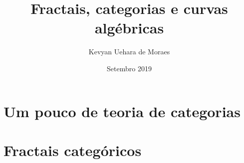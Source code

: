 \documentclass[12pt]{report}
\title{Fractais, categorias e curvas algébricas}
\author{Kevyan Uehara de Moraes}
\date{Setembro 2019}
\theoremstyle{definition}
\begin{document}
\maketitle



\tableofcontents







\chapter{Um pouco de teoria de categorias}

\chapter{Fractais categóricos}

\begin{appendix}
  \listoffigures
  \listoftables
\end{appendix}
\end{document}
